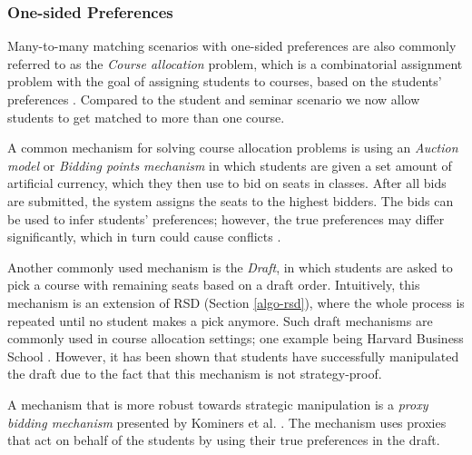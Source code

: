 \subsubsection{One-sided Preferences}
Many-to-many matching scenarios with one-sided preferences are also commonly referred to as the \emph{Course allocation} problem, which is a combinatorial assignment problem with the goal of assigning students to courses, based on the students' preferences \cite{CourseAllocation}. Compared to the student and seminar scenario we now allow students to get matched to more than one course. 

A common mechanism for solving course allocation problems is using an \emph{Auction model} or \emph{Bidding points mechanism} in which students are given a set amount of artificial currency, which they then use to bid on seats in classes. After all bids are submitted, the system assigns the seats to the highest bidders. The bids can be used to infer students' preferences; however, the true preferences may differ significantly, which in turn could cause conflicts \cite{Bidding}.

Another commonly used mechanism is the \emph{Draft}, in which students are asked to pick a course with remaining seats based on a draft order. Intuitively, this mechanism is an extension of RSD (Section \ref{algo-rsd}), where the whole process is repeated until no student makes a pick anymore. Such draft mechanisms are commonly used in course allocation settings; one example being Harvard Business School \cite{CourseAllocation}. However, it has been shown that students have successfully manipulated the draft due to the fact that this mechanism is not strategy-proof.

A mechanism that is more robust towards strategic manipulation is a \emph{proxy bidding mechanism} presented by Kominers et al. \cite{CourseAllocation}. The mechanism uses proxies that act on behalf of the students by using their true preferences in the draft.

